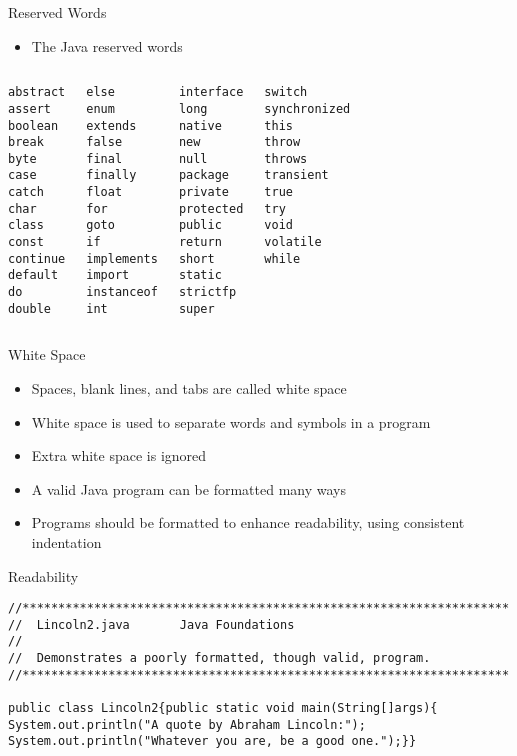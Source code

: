 \documentclass{beamer}
\begin{document}
\begin{frame}[fragile]{Reserved Words}
\begin{itemize}
\item The Java reserved words
\end{itemize}
\begin{columns}[c]
\begin{lstlisting}
abstract
assert
boolean
break
byte
case
catch
char
class
const
continue
default
do
double
\end{lstlisting}

\begin{lstlisting}
else
enum
extends
false
final
finally
float
for
goto
if
implements
import
instanceof
int
\end{lstlisting}
\begin{lstlisting}
interface
long
native
new
null
package
private
protected
public
return
short
static
strictfp
super
\end{lstlisting}
\begin{lstlisting}
switch
synchronized
this
throw
throws
transient
true
try
void
volatile
while
\end{lstlisting}
\end{columns}
\end{frame}

\begin{frame}{White Space}
\begin{itemize}
\item Spaces, blank lines, and tabs are called white space
\item White space is used to separate words and symbols in a program
\item Extra white space is ignored
\item A valid Java program can be formatted many ways
\item Programs should be formatted to enhance readability, using consistent indentation
\end{itemize}
\end{frame}

\begin{frame}[fragile]{Readability}
\begin{lstlisting}
//********************************************************************
//  Lincoln2.java       Java Foundations
//
//  Demonstrates a poorly formatted, though valid, program.
//********************************************************************

public class Lincoln2{public static void main(String[]args){
System.out.println("A quote by Abraham Lincoln:");
System.out.println("Whatever you are, be a good one.");}}
\end{lstlisting}
\end{frame}
\end{document}
